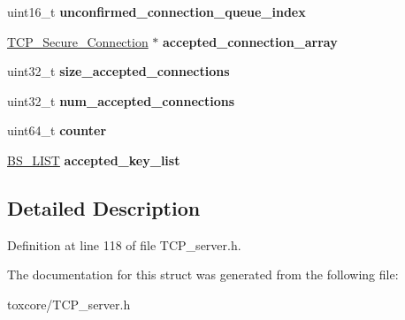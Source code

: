 \begin{DoxyCompactItemize}
\item 
\hypertarget{struct_t_c_p___server_a86567f857493f585eb843963350a9f0b}{uint16\+\_\+t {\bfseries unconfirmed\+\_\+connection\+\_\+queue\+\_\+index}}\label{struct_t_c_p___server_a86567f857493f585eb843963350a9f0b}

\item 
\hypertarget{struct_t_c_p___server_aaec24f8b80a7853d1b7da87e903c44ee}{\hyperlink{struct_t_c_p___secure___connection}{T\+C\+P\+\_\+\+Secure\+\_\+\+Connection} $\ast$ {\bfseries accepted\+\_\+connection\+\_\+array}}\label{struct_t_c_p___server_aaec24f8b80a7853d1b7da87e903c44ee}

\item 
\hypertarget{struct_t_c_p___server_a6348c77f7067c2876de893aedb559972}{uint32\+\_\+t {\bfseries size\+\_\+accepted\+\_\+connections}}\label{struct_t_c_p___server_a6348c77f7067c2876de893aedb559972}

\item 
\hypertarget{struct_t_c_p___server_a77b20b49521cea9c12823bae50db6557}{uint32\+\_\+t {\bfseries num\+\_\+accepted\+\_\+connections}}\label{struct_t_c_p___server_a77b20b49521cea9c12823bae50db6557}

\item 
\hypertarget{struct_t_c_p___server_a1944753ac8107ec537f75b7e0201d866}{uint64\+\_\+t {\bfseries counter}}\label{struct_t_c_p___server_a1944753ac8107ec537f75b7e0201d866}

\item 
\hypertarget{struct_t_c_p___server_ae01209a4897757539a5ff199cdcfb64c}{\hyperlink{struct_b_s___l_i_s_t}{B\+S\+\_\+\+L\+I\+S\+T} {\bfseries accepted\+\_\+key\+\_\+list}}\label{struct_t_c_p___server_ae01209a4897757539a5ff199cdcfb64c}

\end{DoxyCompactItemize}


\subsection{Detailed Description}


Definition at line 118 of file T\+C\+P\+\_\+server.\+h.



The documentation for this struct was generated from the following file\+:\begin{DoxyCompactItemize}
\item 
toxcore/T\+C\+P\+\_\+server.\+h\end{DoxyCompactItemize}
